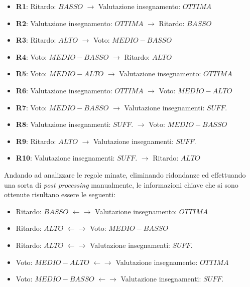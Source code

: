             \begin{itemize}
                \item \textbf{R1}: Ritardo: $BASSO$ $\rightarrow$ Valutazione insegnamento: $OTTIMA$
                \item \textbf{R2}: Valutazione insegnamento: $OTTIMA$ $\rightarrow$ Ritardo: $BASSO$
                \item \textbf{R3}: Ritardo: $ALTO$ $\rightarrow$ Voto: $MEDIO-BASSO$
                \item \textbf{R4}: Voto: $MEDIO-BASSO$ $\rightarrow$ Ritardo: $ALTO$
                \item \textbf{R5}: Voto: $MEDIO-ALTO$ $\rightarrow$ Valutazione insegnamento: $OTTIMA$
                \item \textbf{R6}: Valutazione insegnamento: $OTTIMA$ $\rightarrow$ Voto: $MEDIO-ALTO$
                \item \textbf{R7}: Voto: $MEDIO-BASSO$ $\rightarrow$ Valutazione insegnamenti: $SUFF.$
                \item \textbf{R8}: Valutazione insegnamenti: $SUFF.$ $\rightarrow$ Voto: $MEDIO-BASSO$
                \item \textbf{R9}: Ritardo: $ALTO$ $\rightarrow$ Valutazione insegnamenti: $SUFF.$
                \item \textbf{R10}: Valutazione insegnamenti: $SUFF.$ $\rightarrow$ Ritardo: $ALTO$
            \end{itemize}

            Andando ad analizzare le regole minate, eliminando ridondanze ed effettuando una sorta di \textit{post processing} manualmente, le informazioni chiave che si sono ottenute risultano essere le seguenti:

            \begin{itemize}
                \item Ritardo: $BASSO$ $\leftarrow \rightarrow$ Valutazione insegnamento: $OTTIMA$
                \item Ritardo: $ALTO$ $\leftarrow \rightarrow$ Voto: $MEDIO-BASSO$
                \item Ritardo: $ALTO$ $\leftarrow \rightarrow$ Valutazione insegnamenti: $SUFF.$
                \item Voto: $MEDIO-ALTO$ $\leftarrow \rightarrow$ Valutazione insegnamento: $OTTIMA$
                \item Voto: $MEDIO-BASSO$ $\leftarrow \rightarrow$ Valutazione insegnamenti: $SUFF.$
            \end{itemize}

